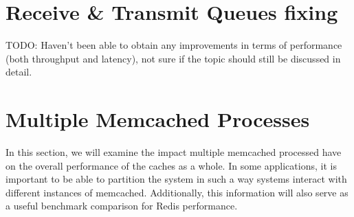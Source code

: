 \section{Receive \& Transmit Queues fixing}
TODO: Haven't been able to obtain any improvements in terms of performance (both throughput and latency), not sure if the topic should still be discussed in detail.


\section{Multiple Memcached Processes}

In this section, we will examine the impact multiple memcached processed have on the overall performance of the caches as a whole. In some applications, it is important to be able to partition the system in such a way systems interact with different instances of memcached. Additionally, this information will also serve as a useful benchmark comparison for Redis performance.